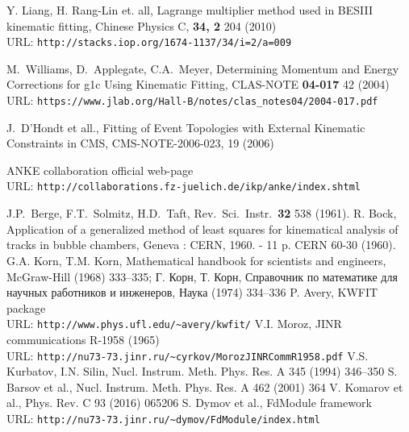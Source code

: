 \documentclass{webofc}
\begin{document}
\begin{thebibliography}{00}
 Y. Liang, H. Rang-Lin et. all, Lagrange multiplier method used in BESIII kinematic fitting, Chinese Physics C, \textbf{34, 2} 204 (2010) \\ URL: \texttt{http://stacks.iop.org/1674-1137/34/i=2/a=009}

 M.~Williams, D.~Applegate, C.A.~Meyer, Determining Momentum and Energy Corrections for g1c Using Kinematic Fitting, CLAS-NOTE \textbf{04-017} 42 (2004)  \\ URL: \texttt{https://www.jlab.org/Hall-B/notes/clas\_notes04/2004-017.pdf}

 J.~D'Hondt et all., Fitting of Event Topologies with External Kinematic Constraints in CMS, CMS-NOTE-2006-023, 19 (2006)

 ANKE collaboration official web-page\\ URL: \texttt{http://collaborations.fz-juelich.de/ikp/anke/index.shtml}

 J.P.~Berge, F.T.~Solmitz, H.D.~Taft, Rev.\ Sci.\ Instr.\ \textbf{32} 538 (1961).
 R. Bock, Application of a generalized method of least squares for kinematical analysis of tracks in bubble chambers,       Geneva : CERN, 1960. - 11 p. CERN 60-30 (1960).
 G.A. Korn, T.M. Korn, Mathematical handbook for scientists and engineers, McGraw-Hill (1968) 333--335; \foreignlanguage{russian}{Г. Корн, Т. Корн, Справочник по математике для научных работников и инженеров, Наука (1974) 334--336}
 P. Avery, KWFIT package\\ URL: \texttt{http://www.phys.ufl.edu/\textasciitilde{}avery/kwfit/}
 V.I. Moroz, JINR communications R-1958 (1965)\\ URL: \texttt{http://nu73-73.jinr.ru/\textasciitilde{}cyrkov/MorozJINRCommR1958.pdf}
 V.S. Kurbatov, I.N. Silin, Nucl. Instrum. Meth. Phys. Res. A 345 (1994) 346--350
 S. Barsov et al., Nucl. Instrum. Meth. Phys. Res. A 462 (2001) 364
 V. Komarov et al., Phys. Rev. C 93 (2016) 065206
 S. Dymov et al., FdModule framework\\ URL: \texttt{http://nu73-73.jinr.ru/\textasciitilde{}dymov/FdModule/index.html}


\end{thebibliography}
\end{document}
